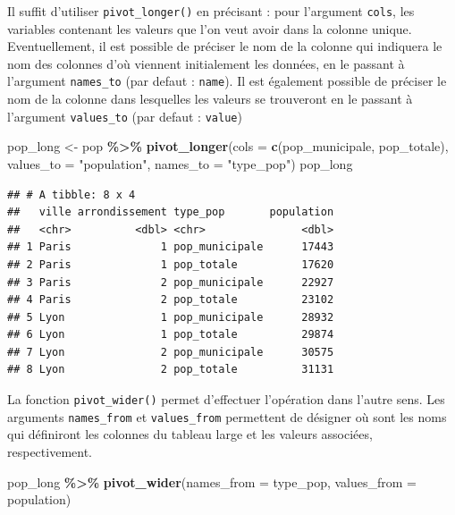 \documentclass[
  11pt,
]{book}
\newenvironment{Shaded}{\begin{snugshade}}{\end{snugshade}}
\newcommand{\DataTypeTok}[1]{\textcolor[rgb]{0.13,0.29,0.53}{#1}}
\newcommand{\KeywordTok}[1]{\textcolor[rgb]{0.13,0.29,0.53}{\textbf{#1}}}
\newcommand{\NormalTok}[1]{#1}
\newcommand{\OperatorTok}[1]{\textcolor[rgb]{0.81,0.36,0.00}{\textbf{#1}}}
\newcommand{\StringTok}[1]{\textcolor[rgb]{0.31,0.60,0.02}{#1}}
\numberwithin{equation}{section}
\numberwithin{countremarque}{section}
\begin{document}
Il suffit d'utiliser \texttt{pivot\_longer()} en précisant : pour l'argument \texttt{cols}, les variables contenant les valeurs que l'on veut avoir dans la colonne unique. Eventuellement, il est possible de préciser le nom de la colonne qui indiquera le nom des colonnes d'où viennent initialement les données, en le passant à l'argument \texttt{names\_to} (par defaut : \texttt{name}). Il est également possible de préciser le nom de la colonne dans lesquelles les valeurs se trouveront en le passant à l'argument \texttt{values\_to} (par defaut : \texttt{value})

\begin{Shaded}
\begin{Highlighting}[]
\NormalTok{pop\_long \textless{}{-}}\StringTok{ }\NormalTok{pop }\OperatorTok{\%\textgreater{}\%}\StringTok{ }
\StringTok{  }\KeywordTok{pivot\_longer}\NormalTok{(}\DataTypeTok{cols =} \KeywordTok{c}\NormalTok{(pop\_municipale, pop\_totale),}
               \DataTypeTok{values\_to =} \StringTok{"population"}\NormalTok{,}
               \DataTypeTok{names\_to =} \StringTok{"type\_pop"}\NormalTok{)}
\NormalTok{pop\_long}
\end{Highlighting}
\end{Shaded}

\begin{lstlisting}
## # A tibble: 8 x 4
##   ville arrondissement type_pop       population
##   <chr>          <dbl> <chr>               <dbl>
## 1 Paris              1 pop_municipale      17443
## 2 Paris              1 pop_totale          17620
## 3 Paris              2 pop_municipale      22927
## 4 Paris              2 pop_totale          23102
## 5 Lyon               1 pop_municipale      28932
## 6 Lyon               1 pop_totale          29874
## 7 Lyon               2 pop_municipale      30575
## 8 Lyon               2 pop_totale          31131
\end{lstlisting}

La fonction \texttt{pivot\_wider()} permet d'effectuer l'opération dans l'autre sens. Les arguments \texttt{names\_from} et \texttt{values\_from} permettent de désigner où sont les noms qui définiront les colonnes du tableau large et les valeurs associées, respectivement.

\begin{Shaded}
\begin{Highlighting}[]
\NormalTok{pop\_long }\OperatorTok{\%\textgreater{}\%}\StringTok{ }
\StringTok{  }\KeywordTok{pivot\_wider}\NormalTok{(}\DataTypeTok{names\_from =}\NormalTok{ type\_pop, }\DataTypeTok{values\_from =}\NormalTok{ population)}
\end{Highlighting}
\end{Shaded}
\end{document}
